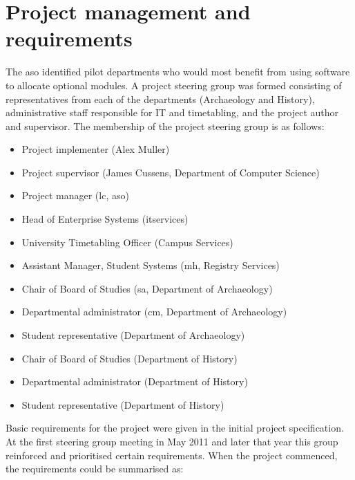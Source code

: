 
\section{Project management and requirements}
\label{sec:requirements}

The \gls{aso} identified pilot departments who would most benefit from using
software to allocate optional modules. A project steering group was formed
consisting of representatives from each of the departments (Archaeology and
History), administrative staff responsible for IT and timetabling, and the
project author and supervisor. The membership of the project steering group is
as follows:

\begin{itemize}
  \item Project implementer (Alex Muller)
  \item Project supervisor (James Cussens, Department of Computer Science)
  \item Project manager (\gls{lc}, \gls{aso})
  \item Head of Enterprise Systems (\gls{itservices})
  \item University Timetabling Officer (Campus Services)
  \item Assistant Manager, Student Systems (\gls{mh}, Registry Services)
  \item Chair of Board of Studies (\gls{sa}, Department of Archaeology)
  \item Departmental administrator (\gls{cm}, Department of Archaeology)
  \item Student representative (Department of Archaeology)
  \item Chair of Board of Studies (Department of History)
  \item Departmental administrator (Department of History)
  \item Student representative (Department of History)
\end{itemize}

Basic requirements for the project were given in the initial project
specification. At the first steering group meeting in May 2011 and later that
year this group reinforced and prioritised certain requirements. When the
project commenced, the requirements could be summarised as:

